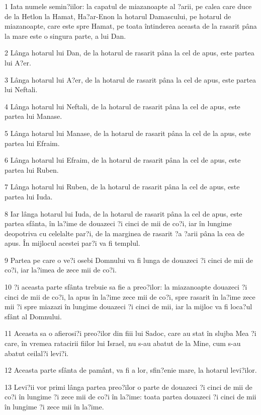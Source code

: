 \par 1 Iata numele semin?iilor: la capatul de miazanoapte al ?arii, pe calea care duce de la Hetlon la Hamat, Ha?ar-Enon la hotarul Damascului, pe hotarul de miazanoapte, care este spre Hamat, pe toata întinderea aceasta de la rasarit pâna la mare este o singura parte, a lui Dan.
\par 2 Lânga hotarul lui Dan, de la hotarul de rasarit pâna la cel de apus, este partea lui A?er.
\par 3 Lânga hotarul lui A?er, de la hotarul de rasarit pâna la cel de apus, este partea lui Neftali.
\par 4 Lânga hotarul lui Neftali, de la hotarul de rasarit pâna la cel de apus, este partea lui Manase.
\par 5 Lânga hotarul lui Manase, de la hotarul de rasarit pâna la cel de la apus, este partea lui Efraim.
\par 6 Lânga hotarul lui Efraim, de la hotarul de rasarit pâna la cel de apus, este partea lui Ruben.
\par 7 Lânga hotarul lui Ruben, de la hotarul de rasarit pâna la cel de apus, este partea lui Iuda.
\par 8 Iar lânga hotarul lui Iuda, de la hotarul de rasarit pâna la cel de apus, este partea sfânta, în la?ime de douazeci ?i cinci de mii de co?i, iar în lungime deopotriva cu celelalte par?i, de la marginea de rasarit ?a ?arii pâna la cea de apus. În mijlocul acestei par?i va fi templul.
\par 9 Partea pe care o ve?i osebi Domnului va fi lunga de douazeci ?i cinci de mii de co?i, iar la?imea de zece mii de co?i.
\par 10 ?i aceasta parte sfânta trebuie sa fie a preo?ilor: la miazanoapte douazeci ?i cinci de mii de co?i, la apus în la?ime zece mii de co?i, spre rasarit în la?ime zece mii ?i spre miazazi în lungime douazeci ?i cinci de mii, iar la mijloc va fi loca?ul sfânt al Domnului.
\par 11 Aceasta sa o afierosi?i preo?ilor din fiii lui Sadoc, care au stat în slujba Mea ?i care, în vremea ratacirii fiilor lui Israel, nu s-au abatut de la Mine, cum s-au abatut ceilal?i levi?i.
\par 12 Aceasta parte sfânta de pamânt, va fi a lor, sfin?enie mare, la hotarul levi?ilor.
\par 13 Levi?ii vor primi lânga partea preo?ilor o parte de douazeci ?i cinci de mii de co?i în lungime ?i zece mii de co?i în la?ime: toata partea douazeci ?i cinci de mii în lungime ?i zece mii în la?ime.

